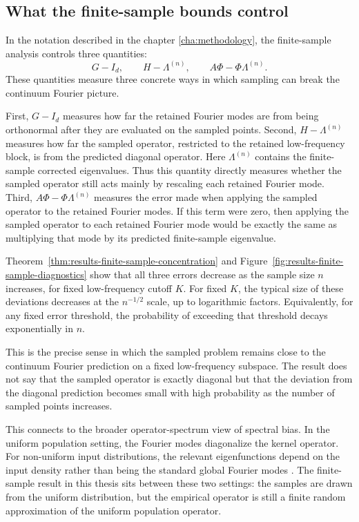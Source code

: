 \subsection{What the finite-sample bounds control}
\label{subsec:discussion-finite-data-structure}

In the notation described in the chapter \ref{cha:methodology}, the finite-sample analysis controls
three quantities:
\[
	G-I_d,
	\qquad
	H-\Lambda^{(n)},
	\qquad
	A\Phi-\Phi\Lambda^{(n)}.
\]
These quantities measure three concrete ways in which sampling can break the
continuum Fourier picture.

First, \(G-I_d\) measures how far the retained Fourier modes are from being
orthonormal after they are evaluated on the sampled points. Second,
\(H-\Lambda^{(n)}\) measures how far the sampled operator, restricted to the
retained low-frequency block, is from the predicted diagonal operator. Here
\(\Lambda^{(n)}\) contains the finite-sample corrected eigenvalues. Thus this
quantity directly measures whether the sampled operator still acts mainly by
rescaling each retained Fourier mode. Third, \(A\Phi-\Phi\Lambda^{(n)}\)
measures the error made when applying the sampled operator to the retained
Fourier modes. If this term were zero, then applying the sampled operator to
each retained Fourier mode would be exactly the same as multiplying that mode
by its predicted finite-sample eigenvalue.

Theorem~\ref{thm:results-finite-sample-concentration} and
Figure~\ref{fig:results-finite-sample-diagnostics} show that all three errors
decrease as the sample size \(n\) increases, for fixed low-frequency cutoff
\(K\). For fixed \(K\), the typical size of these deviations decreases at the
\(n^{-1/2}\) scale, up to logarithmic factors. Equivalently, for any fixed error
threshold, the probability of exceeding that threshold decays exponentially in
\(n\).

This is the precise sense in which the sampled problem remains close to the
continuum Fourier prediction on a fixed low-frequency subspace. The result does
not say that the sampled operator is exactly diagonal but that the
deviation from the diagonal prediction becomes small with high probability as
the number of sampled points increases.

This connects to the broader operator-spectrum view of spectral bias. In the
uniform population setting, the Fourier modes diagonalize the kernel operator.
For non-uniform input distributions, the relevant eigenfunctions depend on the
input density rather than being the standard global Fourier modes
\citep{basri2020frequencybiasneuralnetworks,bietti2019inductivebiasneuraltangent,
	cao2020understandingspectralbiasdeep}. The finite-sample result in this thesis
sits between these two settings: the samples are drawn from the uniform
distribution, but the empirical operator is still a finite random approximation
of the uniform population operator.


